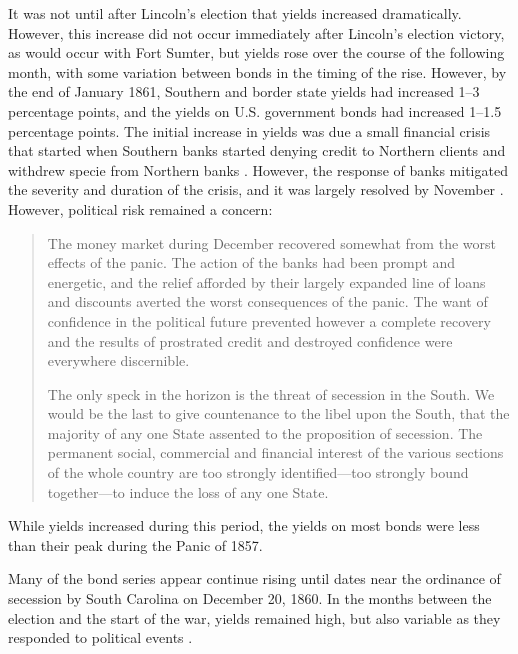 It was not until after Lincoln's election that yields increased dramatically.
However, this increase did not occur immediately after Lincoln's election victory, as would occur with Fort Sumter, but yields rose over the course of the following month, with some variation between bonds in the timing of the rise.
However, by the end of January 1861, Southern and border state yields had increased 1--3 percentage points, and the yields on U.S. government bonds had increased 1--1.5 percentage points.
The initial increase in yields was due a small financial crisis that started when Southern banks started denying credit to Northern clients and withdrew specie from Northern banks \parencite[76]{HomansDana1861a}.
However, the response of banks mitigated the severity and duration of the crisis, and it was largely resolved by November \parencite[539-542]{BankersMagazine1860}.
However, political risk remained a concern:
\begin{quote}
\item The money market during December recovered somewhat from the worst effects of the panic.
  The action of the banks had been prompt and energetic, and the relief afforded by their largely expanded line of loans and discounts averted the worst consequences of the panic.
  The want of confidence in the political future prevented however a complete recovery and the results of prostrated credit and destroyed confidence were everywhere discernible. \parencite[\textit{Bankers' Magazine}, January 1861:][541]{BankersMagazine1860}

  The only speck in the horizon is the threat of secession in the South.
  We would be the last to give countenance to the libel upon the South, that the majority of any one State assented to the proposition of secession.
  The permanent social, commercial and financial interest of the various sections of the whole country are too strongly identified---too strongly bound together---to induce the loss of any one State. \parencites[\textit{Bankers' Magazine}, December 1860:][419]{BankersMagazine1860}
\end{quote}
While yields increased during this period, the yields on most bonds were less than their peak during the Panic of 1857.

Many of the bond series appear continue rising until dates near the ordinance of secession by South Carolina on December 20, 1860.
In the months between the election and the start of the war, yields remained high, but also variable as they responded to political events \parencites[718]{HuntKettellHomansEtAl1860}[78,198,416,677]{HomansDana1861a}[413,481,669,756,838]{BankersMagazine1860}.%

